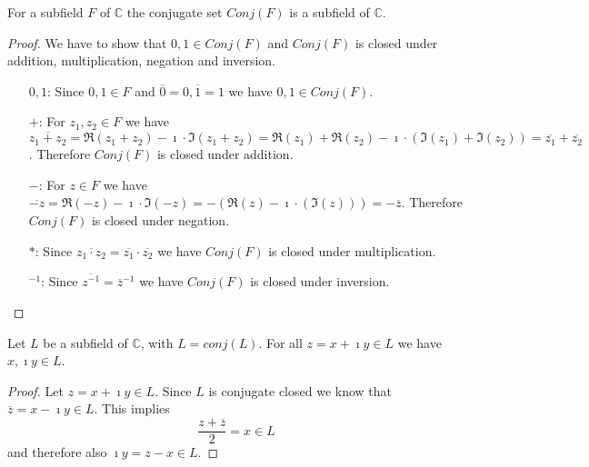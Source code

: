 \begin{lemma}
    \label{lem:ConjClosed.conj_field}
    \leanok
    For a subfield $F$  of $\mathbb{C}$ the conjugate set $Conj(F)$ is a subfield of $\mathbb{C}$.
\end{lemma}
\begin{proof}
    We have to show that $0,1 \in Conj(F)$ and $Conj(F)$ is closed under addition, multiplication, negation and inversion.
    \begin{itemize}
        \item [$0,1$:] Since $0,1 \in F$ and $\overline{0} = 0, \overline{1} = 1$ we have $0,1 \in Conj(F)$.
        \item [$+$:] For $z_1,z_2 \in F$ we have $\overline{z_1 + z_2} =  \Re(z_1 + z_2)  - \imath\cdot \Im(z_1 + z_2) = \Re(z_1) + \Re(z_2) - \imath\cdot (\Im(z_1) + \Im(z_2)) = \overline{z_1} + \overline{z_2}$. Therefore $Conj(F)$ is closed under addition.
        \item [$-$:] For $z \in F$ we have $\overline{-z} = \Re(-z) - \imath\cdot \Im(-z) = -(\Re(z) - \imath\cdot (\Im(z))) = -\overline{z}$. Therefore $Conj(F)$ is closed under negation.
        \item [$*$:] Since $\overline{z_1 \cdot z_2} = \overline{z_1} \cdot \overline{z_2}$ we have $Conj(F)$ is closed under multiplication.
        \item [$^{-1}$:] Since $\overline{z^{-1}} = \overline{z}^{-1}$ we have $Conj(F)$ is closed under inversion.
    \end{itemize}
\end{proof}

\begin{lemma}
    \label{lem:ConjClosed.re_im_in_L}
    \leanok
    Let $L$ be a subfield of $\mathbb{C}$, with $L = conj(L)$. For all $z = x + \imath y \in L$ we have $x, \imath y \in L$.
\end{lemma}
\begin{proof}
    Let $z = x + \imath y \in L$. Since $L$ is conjugate closed we know that $\overline{z}=x-\imath y \in L$. This implies
    \begin{equation*}
        \frac{z + \overline{z}}{2} = x \in L
    \end{equation*}
    and therefore also $\imath y = z - x \in L$.
\end{proof}


